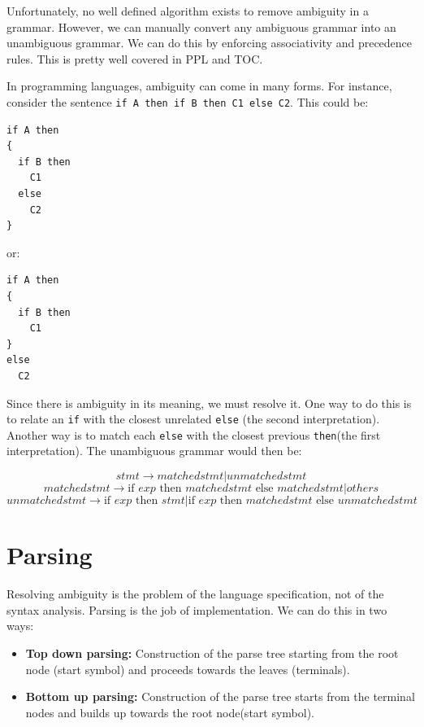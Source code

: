 \documentclass[12pt,letterpaper]{amsbook}
\theoremstyle{definition}
\begin{document}
Unfortunately, no well defined algorithm exists to remove ambiguity in a grammar. However, we can manually convert any ambiguous grammar into an unambiguous grammar. We can do this by enforcing associativity and precedence rules. This is pretty well covered in PPL and TOC.

In programming languages, ambiguity can come in many forms. For instance, consider the sentence \texttt{if A then if B then C1 else C2}.  This could be:

\begin{verbatim}
if A then 
{
  if B then
    C1
  else
    C2
}
\end{verbatim}

or:

\begin{verbatim}
if A then 
{
  if B then
    C1
}
else
  C2
\end{verbatim}

Since there is ambiguity in its meaning, we must resolve it. One way to do this is to relate an \texttt{if} with the closest unrelated \texttt{else} (the second interpretation). Another way is to match each \texttt{else} with the closest previous \texttt{then}(the first interpretation). The unambiguous grammar would then be:

\[stmt \rightarrow matchedstmt | unmatchedstmt\]
\[matchedstmt \rightarrow \text{if }exp \text{ then } matchedstmt \text{ else } matchedstmt | others\]
\[unmatchedstmt \rightarrow \text{if }exp \text{ then } stmt | \text{if }exp \text{ then } matchedstmt \text{ else } unmatchedstmt\]

\section{Parsing}

Resolving ambiguity is the problem of the language specification, not of the syntax analysis. Parsing is the job of implementation. We can do this in two ways:

\begin{itemize}
  \item \textbf{Top down parsing:} Construction of the parse tree starting from the root node (start symbol) and proceeds towards the leaves (terminals).
  \item \textbf{Bottom up parsing:} Construction of the parse tree starts from the terminal nodes and builds up towards the root node(start symbol).
\end{itemize}
\end{document}
